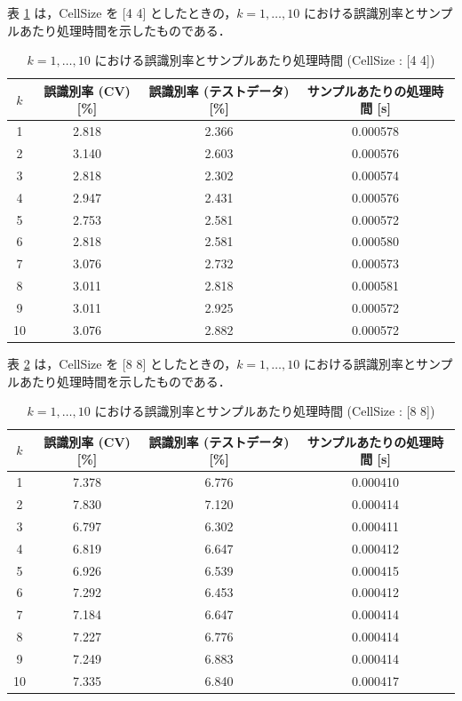 \documentclass[fleqn, a4paper. 12pt]{jsarticle}
\begin{document}
      表 \ref{tab:3} は，CellSize を [4 4] としたときの，$k = 1, \dots, 10$ における誤識別率とサンプルあたり処理時間を示したものである．

      \begin{table}[p]
        \centering
        \caption{$k = 1, \dots, 10$ における誤識別率とサンプルあたり処理時間 (CellSize : [4 4])}
        \begin{tabular}{|c|c|c|c|}
          \hline
          $k$ & 誤識別率 (CV) [\%] & 誤識別率 (テストデータ) [\%] & サンプルあたりの処理時間 [s] \\
          \hline
          1  & 2.818 & 2.366 & 0.000578 \\
          2  & 3.140 & 2.603 & 0.000576 \\
          3  & 2.818 & 2.302 & 0.000574 \\
          4  & 2.947 & 2.431 & 0.000576 \\
          5  & 2.753 & 2.581 & 0.000572 \\
          6  & 2.818 & 2.581 & 0.000580 \\
          7  & 3.076 & 2.732 & 0.000573 \\
          8  & 3.011 & 2.818 & 0.000581 \\
          9  & 3.011 & 2.925 & 0.000572 \\
          10 & 3.076 & 2.882 & 0.000572 \\
          \hline
        \end{tabular}
        \label{tab:3}
      \end{table}

      表 \ref{tab:4} は，CellSize を [8 8] としたときの，$k = 1, \dots, 10$ における誤識別率とサンプルあたり処理時間を示したものである．
      
      \begin{table}[p]
        \centering
        \caption{$k = 1, \dots, 10$ における誤識別率とサンプルあたり処理時間 (CellSize : [8 8])}
        \begin{tabular}{|c|c|c|c|}
          \hline
          $k$ & 誤識別率 (CV) [\%] & 誤識別率 (テストデータ) [\%] & サンプルあたりの処理時間 [s] \\
          \hline
          1  & 7.378 & 6.776 & 0.000410 \\
          2  & 7.830 & 7.120 & 0.000414 \\
          3  & 6.797 & 6.302 & 0.000411 \\
          4  & 6.819 & 6.647 & 0.000412 \\
          5  & 6.926 & 6.539 & 0.000415 \\
          6  & 7.292 & 6.453 & 0.000412 \\
          7  & 7.184 & 6.647 & 0.000414 \\
          8  & 7.227 & 6.776 & 0.000414 \\
          9  & 7.249 & 6.883 & 0.000414 \\
          10 & 7.335 & 6.840 & 0.000417 \\
          \hline
        \end{tabular}
        \label{tab:4}
      \end{table}      
\end{document}
